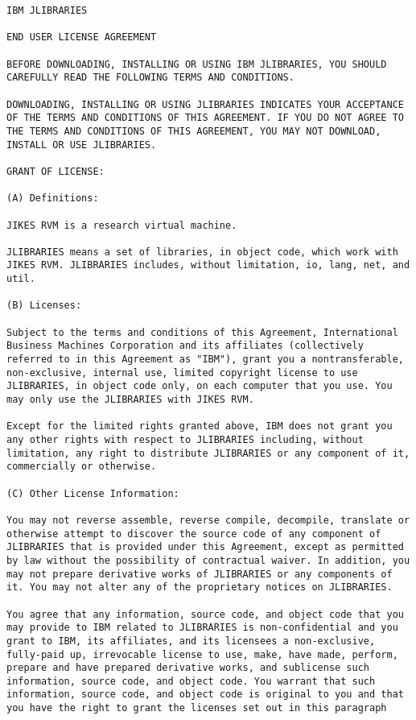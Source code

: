 \begin{verbatim}
IBM JLIBRARIES 

END USER LICENSE AGREEMENT 

BEFORE DOWNLOADING, INSTALLING OR USING IBM JLIBRARIES, YOU SHOULD
CAREFULLY READ THE FOLLOWING TERMS AND CONDITIONS.

DOWNLOADING, INSTALLING OR USING JLIBRARIES INDICATES YOUR ACCEPTANCE
OF THE TERMS AND CONDITIONS OF THIS AGREEMENT. IF YOU DO NOT AGREE TO
THE TERMS AND CONDITIONS OF THIS AGREEMENT, YOU MAY NOT DOWNLOAD,
INSTALL OR USE JLIBRARIES.

GRANT OF LICENSE: 

(A) Definitions: 

JIKES RVM is a research virtual machine. 

JLIBRARIES means a set of libraries, in object code, which work with
JIKES RVM. JLIBRARIES includes, without limitation, io, lang, net, and
util.

(B) Licenses: 

Subject to the terms and conditions of this Agreement, International
Business Machines Corporation and its affiliates (collectively
referred to in this Agreement as "IBM"), grant you a nontransferable,
non-exclusive, internal use, limited copyright license to use
JLIBRARIES, in object code only, on each computer that you use. You
may only use the JLIBRARIES with JIKES RVM.

Except for the limited rights granted above, IBM does not grant you
any other rights with respect to JLIBRARIES including, without
limitation, any right to distribute JLIBRARIES or any component of it,
commercially or otherwise.

(C) Other License Information: 

You may not reverse assemble, reverse compile, decompile, translate or
otherwise attempt to discover the source code of any component of
JLIBRARIES that is provided under this Agreement, except as permitted
by law without the possibility of contractual waiver. In addition, you
may not prepare derivative works of JLIBRARIES or any components of
it. You may not alter any of the proprietary notices on JLIBRARIES.

You agree that any information, source code, and object code that you
may provide to IBM related to JLIBRARIES is non-confidential and you
grant to IBM, its affiliates, and its licensees a non-exclusive,
fully-paid up, irrevocable license to use, make, have made, perform,
prepare and have prepared derivative works, and sublicense such
information, source code, and object code. You warrant that such
information, source code, and object code is original to you and that
you have the right to grant the licenses set out in this paragraph


\end{verbatim}

